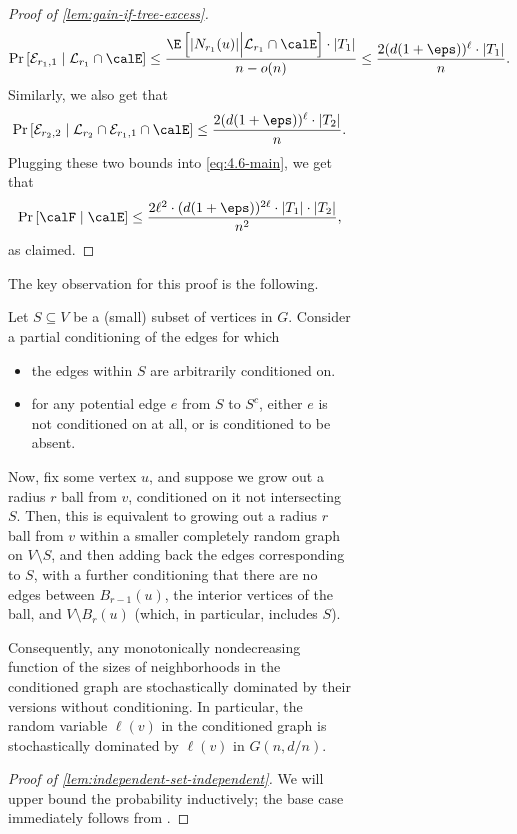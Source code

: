 \documentclass[11pt,letterpaper]{article}
\begin{document}
\begin{figure}
\begin{figure}
\begin{proof}[Proof of \cref{lem:gain-if-tree-excess}]
    \[ \Pr\left[ \mathcal{E}_{r_1,1} \mid \mathcal{L}_{r_1} \cap \calE  \right] \le \frac{\E\left[|N_{r_1}(u)| \Big\vert \mathcal{L}_{r_1} \cap \calE\right] \cdot |T_1|}{n - o(n)} \le \frac{2(d(1+\eps))^{\ell} \cdot |T_1|}{n} . \]
    Similarly, we also get that
    \[ \Pr\left[ \mathcal{E}_{r_2,2} \mid \mathcal{L}_{r_2} \cap \mathcal{E}_{r_1,1} \cap \calE \right] \le \frac{2(d(1+\eps))^{\ell} \cdot |T_2|}{n} . \]
    Plugging these two bounds into \eqref{eq:4.6-main}, we get that
    \[ \Pr\left[ \calF \mid \calE \right] \le \frac{2\ell^2 \cdot (d(1+\eps))^{2\ell} \cdot |T_1| \cdot |T_2|}{n^2}, \]
    as claimed.
\end{proof}

\lineindependent*

The key observation for this proof is the following.

\begin{observation}
    \label{obs:tail-bounds-better-after-conditioning}
    Let $S \subseteq V$ be a (small) subset of vertices in $G$. Consider a partial conditioning of the edges for which
    \begin{itemize}
        \item the edges within $S$ are arbitrarily conditioned on.
        \item for any potential edge $e$ from $S$ to $S^c$, either $e$ is not conditioned on at all, or is conditioned to be absent.
    \end{itemize}
    Now, fix some vertex $u$, and suppose we grow out a radius $r$ ball from $v$, conditioned on it not intersecting $S$. Then, this is equivalent to growing out a radius $r$ ball from $v$ within a smaller completely random graph on $V \setminus S$, and then adding back the edges corresponding to $S$, with a further conditioning that there are no edges between $B_{r-1}(u)$, the interior vertices of the ball, and $V \setminus B_{r}(u)$ (which, in particular, includes $S$).
    
    Consequently, any monotonically nondecreasing function of the sizes of neighborhoods in the conditioned graph are stochastically dominated by their versions without conditioning. In particular, the random variable $\ell(v)$ in the conditioned graph is stochastically dominated by $\ell(v)$ in $G(n,d/n)$.
\end{observation}

\begin{proof}[Proof of \cref{lem:independent-set-independent}]
    We will upper bound the probability inductively; the base case immediately follows from .


\end{proof}
\end{figure}
\end{figure}
\end{document}
